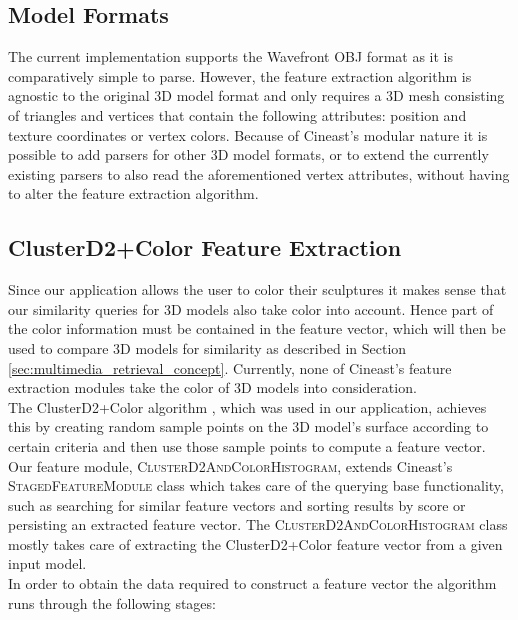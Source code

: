 \subsection{Model Formats}

The current implementation supports the Wavefront OBJ format \cite{wavefront_obj} as it is comparatively
simple to parse. However, the feature extraction algorithm is agnostic to the original 3D model format and only requires
a 3D mesh consisting of triangles and vertices that contain the following attributes: position and texture coordinates or vertex colors.
Because of Cineast's modular nature it is possible to add parsers for other 3D model formats, or
to extend the currently existing parsers to also read the aforementioned vertex attributes, without having to alter
the feature extraction algorithm.

\subsection{ClusterD2+Color Feature Extraction}

Since our application allows the user to color their sculptures it makes sense that our similarity queries for 3D models also
take color into account. Hence part of the color information must be contained in the feature vector, which will then be used
to compare 3D models for similarity as described in Section \ref{sec:multimedia_retrieval_concept}.
Currently, none of Cineast's feature extraction modules take the color of 3D models into consideration.\\
The ClusterD2+Color algorithm \cite{cluster_d2_color}, which was used in our application,
achieves this by creating random sample points on the 3D model's surface according to certain criteria and then
use those sample points to compute a feature vector.\\
Our feature module, \textsc{ClusterD2AndColorHistogram}, extends Cineast's \textsc{StagedFeatureModule} class which takes care of the
querying base functionality, such as searching for similar feature vectors and sorting results by score or persisting an extracted feature vector.
The \textsc{ClusterD2AndColorHistogram} class mostly takes care of extracting the ClusterD2+Color feature vector from a given input model.\\
In order to obtain the data required to construct a feature vector the algorithm runs through the following stages:

